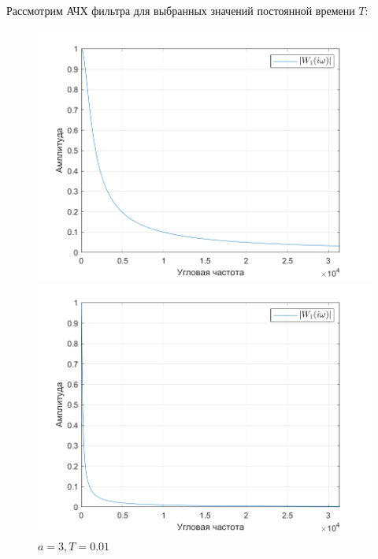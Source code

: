 \documentclass[a4paper]{article}
\begin{document}
Рассмотрим АЧХ фильтра для выбранных значений постоянной времени $T$:

\begin{figure}[H]
    \begin{minipage}{0.5\textwidth}
        \centering
        \includegraphics[width=\linewidth]{ex1_1/a=3_T=0.001/h5.png}
        \caption{$a = 3, T = 0.001$}
    \end{minipage}
    \begin{minipage}{0.5\textwidth}
        \centering
        \includegraphics[width=\linewidth]{ex1_1/a=3_T=0.01/h5.png}
        \caption{$a = 3, T = 0.01$}
    \end{minipage}
\end{figure}
\end{document}
